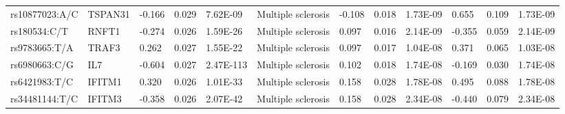 \begin{table}[]
{\begin{tabular}{llllllllllll}
		\rowcolor[HTML]{BEBEBE}rs10877023:A/C                   & TSPAN31                           & -0.166                            & 0.029                           & 7.62E-09                       & Multiple sclerosis                         & -0.108                            & 0.018                           & 1.73E-09                       & 0.655                           & 0.109                           & 1.73E-09                       \\
		\rowcolor[HTML]{BEBEBE}rs180534:C/T                     & RNFT1                             & -0.274                            & 0.026                           & 1.59E-26                       & Multiple sclerosis                         & 0.097                             & 0.016                           & 2.14E-09                       & -0.355                          & 0.059                           & 2.14E-09                       \\
		\rowcolor[HTML]{BEBEBE}rs9783665:T/A                    & TRAF3                             & 0.262                             & 0.027                           & 1.55E-22                       & Multiple sclerosis                         & 0.097                             & 0.017                           & 1.04E-08                       & 0.371                           & 0.065                           & 1.03E-08                       \\
		\rowcolor[HTML]{BEBEBE}rs6980663:C/G                    & IL7                               & -0.604                            & 0.027                           & 2.47E-113                      & Multiple sclerosis                         & 0.102                             & 0.018                           & 1.74E-08                       & -0.169                          & 0.030                           & 1.74E-08                       \\
		\rowcolor[HTML]{BEBEBE}rs6421983:T/C                    & IFITM1                            & 0.320                             & 0.026                           & 1.01E-33                       & Multiple sclerosis                         & 0.158                             & 0.028                           & 1.78E-08                       & 0.495                           & 0.088                           & 1.78E-08                       \\
		\rowcolor[HTML]{BEBEBE}rs34481144:T/C                   & IFITM3                            & -0.358                            & 0.026                           & 2.07E-42                       & Multiple sclerosis                         & 0.158                             & 0.028                           & 2.34E-08                       & -0.440                          & 0.079                           & 2.34E-08                       \\

\end{tabular}}
\end{table}
